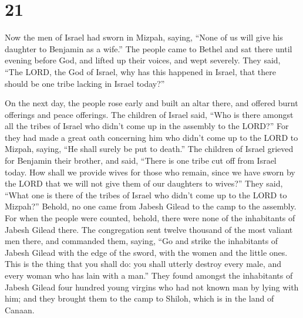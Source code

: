 \hypertarget{section-20}{%
\section{21}\label{section-20}}

 Now the men of Israel had sworn in Mizpah, saying, ``None
of us will give his daughter to Benjamin as a wife.''  The
people came to Bethel and sat there until evening before God, and lifted
up their voices, and wept severely.  They said, ``The
LORD, the God of Israel, why has this happened in Israel, that there
should be one tribe lacking in Israel today?''

 On the next day, the people rose early and built an altar
there, and offered burnt offerings and peace offerings. 
The children of Israel said, ``Who is there amongst all the tribes of
Israel who didn't come up in the assembly to the LORD?'' For they had
made a great oath concerning him who didn't come up to the LORD to
Mizpah, saying, ``He shall surely be put to death.''  The
children of Israel grieved for Benjamin their brother, and said, ``There
is one tribe cut off from Israel today.  How shall we
provide wives for those who remain, since we have sworn by the LORD that
we will not give them of our daughters to wives?''  They
said, ``What one is there of the tribes of Israel who didn't come up to
the LORD to Mizpah?'' Behold, no one came from Jabesh Gilead to the camp
to the assembly.  For when the people were counted,
behold, there were none of the inhabitants of Jabesh Gilead there.
 The congregation sent twelve thousand of the most
valiant men there, and commanded them, saying, ``Go and strike the
inhabitants of Jabesh Gilead with the edge of the sword, with the women
and the little ones.  This is the thing that you shall
do: you shall utterly destroy every male, and every woman who has lain
with a man.''  They found amongst the inhabitants of
Jabesh Gilead four hundred young virgins who had not known man by lying
with him; and they brought them to the camp to Shiloh, which is in the
land of Canaan.

